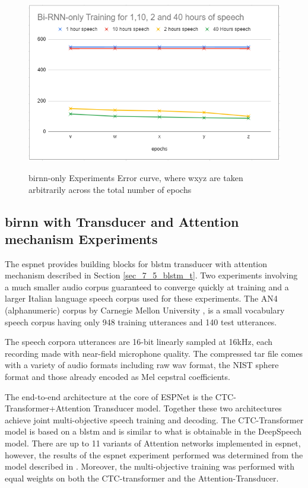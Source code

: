 \begin{figure}
\centering
  \includegraphics[width=14cm]{thesis/images/brnn_only.png}\\
  \caption{\acrshort{birnn}-only Experiments Error curve, where w\<x\<y\<z are taken arbitrarily across the total
number of epochs} \label{fig_6_3_wer}
\end{figure}


\subsection{\acrshort{birnn} with Transducer and Attention mechanism Experiments}
The \acrfull{espnet} \citep{watanabe2018espnet} provides building blocks for \acrshort{blstm} transducer with attention mechanism  described in Section \ref{sec_7_5_blstm_t}.  Two experiments involving a much smaller audio corpus guaranteed to converge quickly at training and a larger Italian language speech corpus \citep{foxvorge2019} used for these experiments.  The AN4 (alphanumeric) corpus by Carnegie Mellon University \citep{acero1990acoustical}, is a small vocabulary speech corpus having only 948 training utterances and 140 test utterances.

The speech corpora utterances are 16-bit linearly sampled at 16kHz, each recording made with near-field microphone quality.  The compressed tar file comes with a variety of audio formats including raw wav format, the NIST sphere format and those already encoded as Mel cepstral coefficients.

The end-to-end architecture at the core of ESPNet is the CTC-Transformer+Attention Transducer model.  Together these two architectures achieve joint multi-objective speech training and decoding.  The CTC-Transformer model is based on a \acrshort{blstm} and is similar to what is obtainable in the DeepSpeech model.  There are up to 11 variants of Attention networks implemented in \acrshort{espnet}, however, the results of the \acrshort{espnet} experiment performed was determined from the model described in \cite{chorowski2015attention}.  Moreover, the multi-objective training was performed with equal weights on both the CTC-transformer and the Attention-Transducer.  

